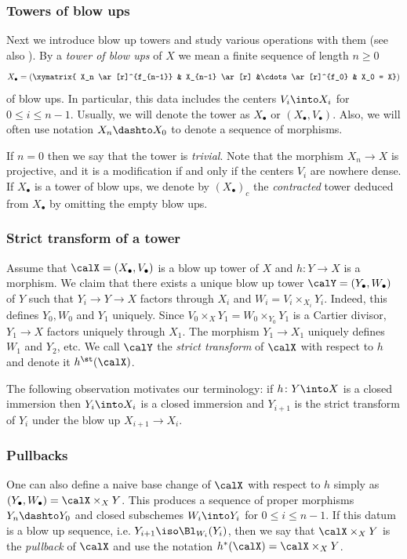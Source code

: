 \documentclass[10pt]{../fichiers-configuration-latex/smfart}
\begin{document}
\subsubsection{Towers of blow ups}\label{8-towerssec} Next we
introduce blow up towers and study various operations with them
(see also \cite[\S2.2]{Temkin@qe}). By a \textit{tower of blow ups}
of $X$ we mean a finite sequence of length $n\ge 0$ $$ X_{\bullet}
= (\xymatrix{ X_n \ar[r]^{f_{n-1}} & X_{n-1} \ar[r] &\cdots
\ar[r]^{f_0} & X_0 = X}) $$ of blow ups. In particular, this data
includes the centers $V_i\into X_i$ for $0\le i\le n-1$. Usually,
we will denote the tower as $X_\bullet$ or $(X_\bullet,V_\bullet)$. Also,
we will often use notation $X_n\dashto X_0$ to denote a sequence
of morphisms.

If $n=0$ then we say that the tower is {\em trivial}. Note that the
morphism $X_n\to X$ is projective, and it is a modification if and
only if the centers $V_i$ are nowhere dense. If $X_{\bullet}$ is a
tower of blow ups, we denote by $(X_\bullet)_c$ the {\em contracted}
tower deduced from $X_{\bullet}$ by omitting the empty blow ups.

\subsubsection{Strict transform of a tower}\label{8-strictsec}
Assume that $\calX=(X_\bullet,V_\bullet)$ is a blow up tower
of $X$ and $h{\colon}Y\to X$ is a morphism. We claim that
there exists a unique blow up tower $\calY=(Y_\bullet,W_\bullet)$
of $Y$ such that $Y_i\to Y\to X$ factors through $X_i$ and
$W_i=V_i\times_{X_i}Y_i$. Indeed, this defines $Y_0,W_0$ and $Y_1$
uniquely. Since $V_0\times_XY_1=W_0\times_{Y_0}Y_1$ is a Cartier
divisor, $Y_1\to X$ factors uniquely through $X_1$. The morphism
$Y_1\to X_1$ uniquely defines $W_1$ and $Y_2$, etc. We call $\calY$
the {\em strict transform} of $\calX$ with respect to $h$ and denote
it $h^\st(\calX)$.

\begin{remark2}\label{8-strtowerrem} The following observation
motivates our terminology: if $h{\colon}Y\into X$ is a closed
immersion then $Y_i\into X_i$ is a closed immersion and $Y_{i+1}$
is the strict transform of $Y_i$ under the blow up $X_{i+1}\to X_i$.
\end{remark2}

\subsubsection{Pullbacks}\label{8-pullsec} One can also define
a naive base change of $\calX$ with respect to $h$ simply as
$(Y_\bullet,W_\bullet)=\calX\times_XY$. This produces a sequence
of proper morphisms $Y_n\dashto Y_0$ and closed subschemes
$W_i\into Y_i$ for $0\le i\le n-1$. If this datum is a blow up
sequence, i.e. $Y_{i+1}\iso\Bl_{W_i}(Y_i)$, then we say that
$\calX\times_XY$ is the {\em pullback} of $\calX$ and use the
notation $h^*(\calX)=\calX\times_XY$.
\end{document}
